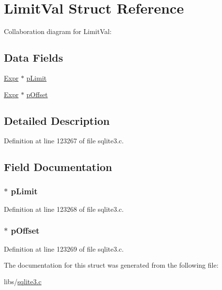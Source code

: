 \hypertarget{struct_limit_val}{}\section{Limit\+Val Struct Reference}
\label{struct_limit_val}


Collaboration diagram for Limit\+Val\+:
\subsection*{Data Fields}
\begin{DoxyCompactItemize}
\item 
\hyperlink{struct_expr}{Expr} $\ast$ \hyperlink{struct_limit_val_a343fcdf61b7e033a4d8cb1f3484e8002}{p\+Limit}
\item 
\hyperlink{struct_expr}{Expr} $\ast$ \hyperlink{struct_limit_val_aeca6406d3cede0e3423dde49f008567b}{p\+Offset}
\end{DoxyCompactItemize}


\subsection{Detailed Description}


Definition at line 123267 of file sqlite3.\+c.



\subsection{Field Documentation}
\hypertarget{struct_limit_val_a343fcdf61b7e033a4d8cb1f3484e8002}{}
\subsubsection[{p\+Limit}]{$\ast$ p\+Limit}\label{struct_limit_val_a343fcdf61b7e033a4d8cb1f3484e8002}


Definition at line 123268 of file sqlite3.\+c.

\hypertarget{struct_limit_val_aeca6406d3cede0e3423dde49f008567b}{}
\subsubsection[{p\+Offset}]{$\ast$ p\+Offset}\label{struct_limit_val_aeca6406d3cede0e3423dde49f008567b}


Definition at line 123269 of file sqlite3.\+c.



The documentation for this struct was generated from the following file\+:\begin{DoxyCompactItemize}
\item 
libs/\hyperlink{sqlite3_8c}{sqlite3.\+c}\end{DoxyCompactItemize}
